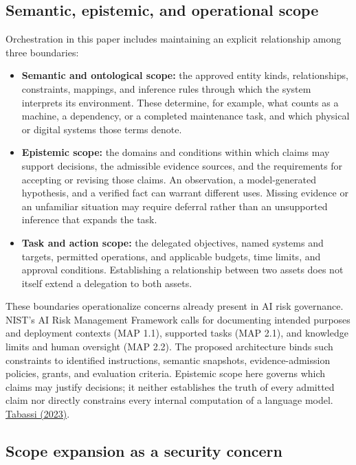 \documentclass[preprint,12pt,authoryear]{elsarticle}
\providecommand{\tightlist}{\setlength{\itemsep}{0pt}\setlength{\parskip}{0pt}}
\begin{document}
\subsection{Semantic, epistemic, and operational
scope}\label{semantic-epistemic-and-operational-scope}

Orchestration in this paper includes maintaining an explicit
relationship among three boundaries:

\begin{itemize}
\tightlist
\item
  \textbf{Semantic and ontological scope:} the approved entity kinds,
  relationships, constraints, mappings, and inference rules through
  which the system interprets its environment. These determine, for
  example, what counts as a machine, a dependency, or a completed
  maintenance task, and which physical or digital systems those terms
  denote.
\item
  \textbf{Epistemic scope:} the domains and conditions within which
  claims may support decisions, the admissible evidence sources, and the
  requirements for accepting or revising those claims. An observation, a
  model-generated hypothesis, and a verified fact can warrant different
  uses. Missing evidence or an unfamiliar situation may require deferral
  rather than an unsupported inference that expands the task.
\item
  \textbf{Task and action scope:} the delegated objectives, named
  systems and targets, permitted operations, and applicable budgets,
  time limits, and approval conditions. Establishing a relationship
  between two assets does not itself extend a delegation to both assets.
\end{itemize}

These boundaries operationalize concerns already present in AI risk
governance. NIST's AI Risk Management Framework calls for documenting
intended purposes and deployment contexts (MAP 1.1), supported tasks
(MAP 2.1), and knowledge limits and human oversight (MAP 2.2). The
proposed architecture binds such constraints to identified instructions,
semantic snapshots, evidence-admission policies, grants, and evaluation
criteria. Epistemic scope here governs which claims may justify
decisions; it neither establishes the truth of every admitted claim nor
directly constrains every internal computation of a language model.
\href{https://doi.org/10.6028/NIST.AI.100-1}{Tabassi (2023)}.

\subsection{Scope expansion as a security
concern}\label{scope-expansion-as-a-security-concern}
\end{document}
